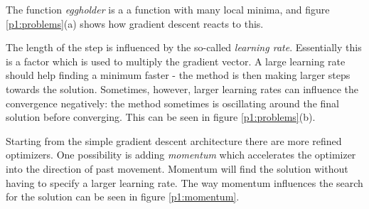 \documentclass[sigconf,nonacm]{acmart}
\begin{document}
The function \emph{eggholder} is a a function with many local minima,
and figure \ref{p1:problems}(a) shows how gradient descent reacts to this.

The length of the step is influenced by the so-called \emph{learning rate}.
Essentially this is a factor which is used to multiply the gradient vector.
A large learning rate should help finding a minimum faster - the method
is then making larger steps towards the solution.
Sometimes, however, larger learning rates can influence the convergence negatively:
the method sometimes is oscillating around the final solution before converging.
This can be seen in figure \ref{p1:problems}(b).

Starting from the simple gradient descent architecture there
are more refined optimizers.
One possibility is adding \emph{momentum} which accelerates
the optimizer into the direction of past movement.
Momentum will find the solution without having to specify
a larger learning rate.
The way momentum influences the search for the solution can
be seen in figure \ref{p1:momentum}.
\end{document}
